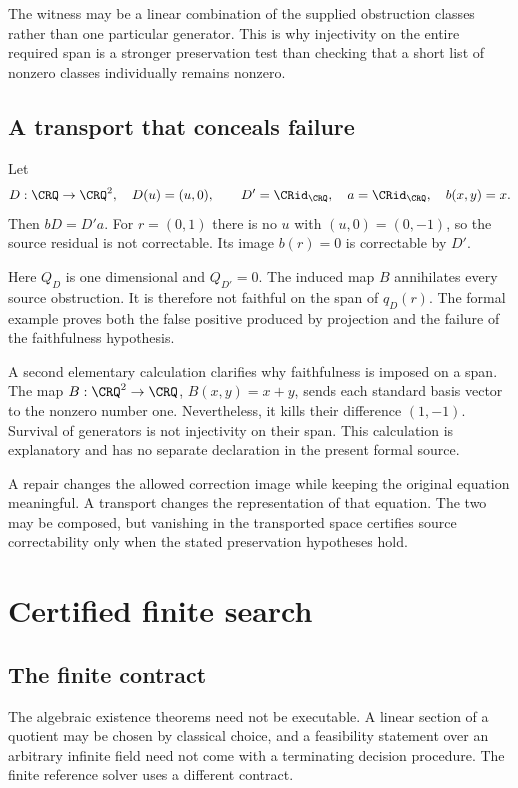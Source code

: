 The witness may be a linear combination of the supplied obstruction classes rather than one particular generator. This is why injectivity on the entire required span is a stronger preservation test than checking that a short list of nonzero classes individually remains nonzero.

\subsection{A transport that conceals failure}
\begin{CRexample}\label{CR:ex:loss}
Let
\[
D:\CRQ\to\CRQ^2,\quad D(u)=(u,0),\qquad
D'=\CRid_{\CRQ},\quad a=\CRid_{\CRQ},\quad b(x,y)=x.
\]
Then $bD=D'a$. For $r=(0,1)$ there is no $u$ with $(u,0)=(0,-1)$, so the source residual is not correctable. Its image $b(r)=0$ is correctable by $D'$.
\end{CRexample}

Here $Q_D$ is one dimensional and $Q_{D'}=0$. The induced map $B$ annihilates every source obstruction. It is therefore not faithful on the span of $q_D(r)$. The formal example proves both the false positive produced by projection and the failure of the faithfulness hypothesis.

A second elementary calculation clarifies why faithfulness is imposed on a span. The map $B:\CRQ^2\to\CRQ$, $B(x,y)=x+y$, sends each standard basis vector to the nonzero number one. Nevertheless, it kills their difference $(1,-1)$. Survival of generators is not injectivity on their span. This calculation is explanatory and has no separate declaration in the present formal source.

\begin{scopebox}[title=Transport is not repair]
A repair changes the allowed correction image while keeping the original equation meaningful. A transport changes the representation of that equation. The two may be composed, but vanishing in the transported space certifies source correctability only when the stated preservation hypotheses hold.
\end{scopebox}

\section{Certified finite search}\label{CR:cr-source-section-5}\label{CR:ch:search}
\subsection{The finite contract}
The algebraic existence theorems need not be executable. A linear section of a quotient may be chosen by classical choice, and a feasibility statement over an arbitrary infinite field need not come with a terminating decision procedure. The finite reference solver uses a different contract.

